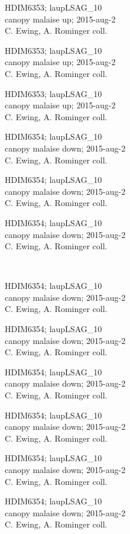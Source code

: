 \documentclass[2pt]{extarticle}
\begin{document}
\noindent
\parbox{0.16\textwidth}{\tiny \raggedright \rule[-0.3\baselineskip]{0pt}{10pt}HDIM6353; laupLSAG\_10\\ canopy malaise up; 2015-aug-2\\ C. Ewing, A. Rominger coll.}
\parbox{0.16\textwidth}{\tiny \raggedright \rule[-0.3\baselineskip]{0pt}{10pt}HDIM6353; laupLSAG\_10\\ canopy malaise up; 2015-aug-2\\ C. Ewing, A. Rominger coll.}
\parbox{0.16\textwidth}{\tiny \raggedright \rule[-0.3\baselineskip]{0pt}{10pt}HDIM6353; laupLSAG\_10\\ canopy malaise up; 2015-aug-2\\ C. Ewing, A. Rominger coll.}
\parbox{0.16\textwidth}{\tiny \raggedright \rule[-0.3\baselineskip]{0pt}{10pt}HDIM6354; laupLSAG\_10\\ canopy malaise down; 2015-aug-2\\ C. Ewing, A. Rominger coll.}
\parbox{0.16\textwidth}{\tiny \raggedright \rule[-0.3\baselineskip]{0pt}{10pt}HDIM6354; laupLSAG\_10\\ canopy malaise down; 2015-aug-2\\ C. Ewing, A. Rominger coll.}
\parbox{0.16\textwidth}{\tiny \raggedright \rule[-0.3\baselineskip]{0pt}{10pt}HDIM6354; laupLSAG\_10\\ canopy malaise down; 2015-aug-2\\ C. Ewing, A. Rominger coll.} \\ 
\vspace{0.001in} 

\noindent
\parbox{0.16\textwidth}{\tiny \raggedright \rule[-0.3\baselineskip]{0pt}{10pt}HDIM6354; laupLSAG\_10\\ canopy malaise down; 2015-aug-2\\ C. Ewing, A. Rominger coll.}
\parbox{0.16\textwidth}{\tiny \raggedright \rule[-0.3\baselineskip]{0pt}{10pt}HDIM6354; laupLSAG\_10\\ canopy malaise down; 2015-aug-2\\ C. Ewing, A. Rominger coll.}
\parbox{0.16\textwidth}{\tiny \raggedright \rule[-0.3\baselineskip]{0pt}{10pt}HDIM6354; laupLSAG\_10\\ canopy malaise down; 2015-aug-2\\ C. Ewing, A. Rominger coll.}
\parbox{0.16\textwidth}{\tiny \raggedright \rule[-0.3\baselineskip]{0pt}{10pt}HDIM6354; laupLSAG\_10\\ canopy malaise down; 2015-aug-2\\ C. Ewing, A. Rominger coll.}
\parbox{0.16\textwidth}{\tiny \raggedright \rule[-0.3\baselineskip]{0pt}{10pt}HDIM6354; laupLSAG\_10\\ canopy malaise down; 2015-aug-2\\ C. Ewing, A. Rominger coll.}
\parbox{0.16\textwidth}{\tiny \raggedright \rule[-0.3\baselineskip]{0pt}{10pt}HDIM6354; laupLSAG\_10\\ canopy malaise down; 2015-aug-2\\ C. Ewing, A. Rominger coll.} \\ 
\vspace{0.001in} 
\end{document}
